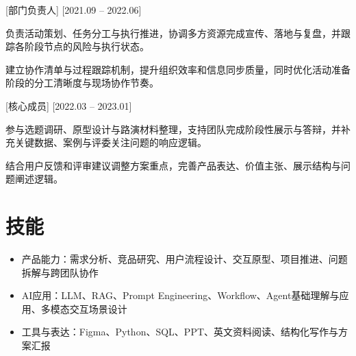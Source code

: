 \documentclass{resume}
\begin{document}
  [部门负责人]
  [2021.09 -- 2022.06]

\begin{ResumeCompactList}
  \item 负责活动策划、任务分工与执行推进，协调多方资源完成宣传、落地与复盘，并跟踪各阶段节点的风险与执行状态。
  \item 建立协作清单与过程跟踪机制，提升组织效率和信息同步质量，同时优化活动准备阶段的分工清晰度与现场协作节奏。
\end{ResumeCompactList}

  [核心成员]
  [2022.03 -- 2023.01]

\begin{ResumeCompactList}
  \item 参与选题调研、原型设计与路演材料整理，支持团队完成阶段性展示与答辩，并补充关键数据、案例与评委关注问题的响应逻辑。
  \item 结合用户反馈和评审建议调整方案重点，完善产品表达、价值主张、展示结构与问题阐述逻辑。
\end{ResumeCompactList}
\section{技能}

\begin{itemize}
  \item 产品能力：需求分析、竞品研究、用户流程设计、交互原型、项目推进、问题拆解与跨团队协作
  \item AI应用：LLM、RAG、Prompt Engineering、Workflow、Agent基础理解与应用、多模态交互场景设计
  \item 工具与表达：Figma、Python、SQL、PPT、英文资料阅读、结构化写作与方案汇报
\end{itemize}
\end{document}
